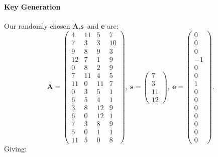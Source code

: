 \documentclass[a4paper, 11pt, openany]{book}
\numberwithin{equation}{section}
\theoremstyle{plain}
\theoremstyle{definition}
\begin{document}
\paragraph{Key Generation}
Our randomly chosen $\textbf{A},\textbf{s}$ and $\textbf{e}$ are:
$$\textbf{A} = \begin{pmatrix}  
4& 11&  5&  7\\
7&  3&  3& 10\\
9&  8&  9&  3\\
12&  7&  1&  9\\
0&  8&  2&  9\\
7& 11&  4&  5\\
11&  0& 11&  7\\
0&  3&  5&  1\\
6&  5&  4&  1\\
3&  8& 12&  9\\
6&  0& 12&  1\\
7&  3&  8&  9\\
5&  0&  1&  1\\
11&  5&  0&  8
\end{pmatrix},~ 
\textbf{s} = \begin{pmatrix} 7 \\ 3 \\ 11 \\ 12 \end{pmatrix},~
\textbf{e} = \begin{pmatrix}0\\0\\0\\-1\\0\\0\\1\\0\\0\\0\\0\\0\\0\\0\end{pmatrix}.
$$
Giving:
\end{document}
